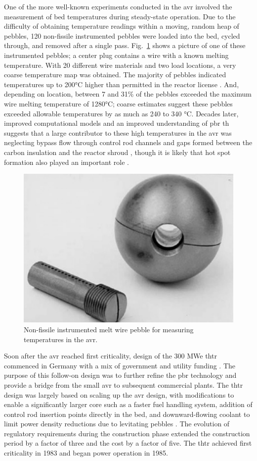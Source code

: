 One of the more well-known experiments conducted in the \gls{avr} involved the measurement of bed temperatures during steady-state operation. Due to the difficulty of obtaining temperature readings within a moving, random heap of pebbles, 120 non-fissile instrumented pebbles were loaded into the bed, cycled through, and removed after a single pass. Fig.\ \ref{fig:avr_melt} shows a picture of one of these instrumented pebbles; a center plug contains a wire with a known melting temperature. With 20 different wire materials and two load locations, a very coarse temperature map was obtained. The majority of pebbles indicated temperatures up to 200\si{\celsius} higher than permitted in the reactor license \cite{sobes,moormann}. And, depending on location, between 7 and 31\% of the pebbles exceeded the maximum wire melting temperature of 1280\si{\celsius}; coarse estimates suggest these pebbles exceeded allowable temperatures by as much as 240 to 340 \si{\celsius}. Decades later, improved computational models and an improved understanding of \gls{pbr} \gls{th} suggests that a large contributor to these high temperatures in the \gls{avr} was neglecting bypass flow through control rod channels and gaps formed between the carbon insulation and the reactor shroud \cite{viljoen}, though it is likely that hot spot formation also played an important role \cite{moormann}.

\begin{figure}[!h]
\centering
\includegraphics[width=0.4\linewidth]{figs/avr_melt_wire.png}
\caption{Non-fissile instrumented melt wire pebble for measuring temperatures in the \gls{avr}.}
\label{fig:avr_melt}
\end{figure}

Soon after the \gls{avr} reached first criticality, design of the 300 MWe \gls{thtr} commenced in Germany with a mix of government and utility funding \cite{oehme,thtr_1990,hecker,hofmann}. The purpose of this follow-on design was to further refine the \gls{pbr} technology and provide a bridge from the small \gls{avr} to subsequent commercial plants. The \gls{thtr} design was largely based on scaling up the \gls{avr} design, with modifications to enable a significantly larger core such as a faster fuel handling system, addition of control rod insertion points directly in the bed, and downward-flowing coolant to limit power density reductions due to levitating pebbles \cite{claxton}. The evolution of regulatory requirements during the construction phase extended the construction period by a factor of three and the cost by a factor of five. The \gls{thtr} achieved first criticality in 1983 and began power operation in 1985. 

